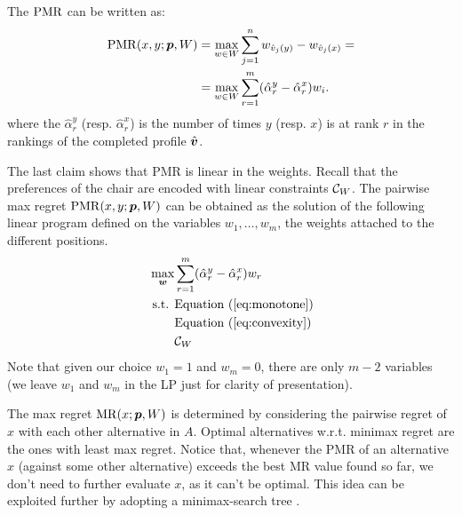 
\begin{claim}
The $\operatorname{PMR}$ can be written as:
\begin{align} 
\operatorname{PMR}(x,y; {\bm{p}}, W)  
& = \max_{w \in W} \sum_{j=1}^n w_{\hat{v}_j(y)} - w_{\hat{v}_j(x)} = \\ 
& = \max_{w \in W} \sum_{r=1}^m (\hat{\alpha}_{r}^{y} - \hat{\alpha}_{r}^{x}) w_i. 
\end{align}
where the $\hat{\alpha}_{r}^{y}$ (resp. $\hat{\alpha}_{r}^{x}$)  is the number of times $y$ (resp. $x$) is at rank $r$ in the rankings of the completed profile $\hat{\bm{v}}$.
\end{claim}
The last claim shows that PMR is linear in the weights.
Recall that the preferences of the chair are encoded with linear constraints $\mathcal{C}_{W}$.
The pairwise max regret $\operatorname{PMR}(x,y; {\bm{p}},W)$ can be obtained as the solution of the following linear program defined on the variables $w_1, …, w_m$, the weights attached to the different positions. 
\begin{align*}
\max_{\bm{w}} & \sum_{r=1}^m (\hat{\alpha}_{r}^{y} - \hat{\alpha}_{r}^{x}) w_{r}\\
\text{ s.t. } & \text{Equation } (\ref{eq:monotone})\\
& \text{Equation } (\ref{eq:convexity})\\
& \mathcal{C}_W
\end{align*}
Note that given our choice $w_{1}=1$ and $w_{m}=0$, there are only $m-2$ variables 
(we leave $w_{1}$ and $w_{m}$ in the LP just for clarity of presentation).

The max regret $\operatorname{MR}(x; {\bm{p}}, W)$ is determined by considering the pairwise regret of $x$ with each other alternative in $A$.
Optimal alternatives w.r.t. minimax regret are the ones with least max regret. 
Notice that, whenever the PMR of an alternative $x$ (against some other alternative) exceeds the best MR value found so far, we don't need to further evaluate $x$, as it can't be optimal. 
This idea can be exploited further by adopting a minimax-search tree \citep{Braziunas2011}.

